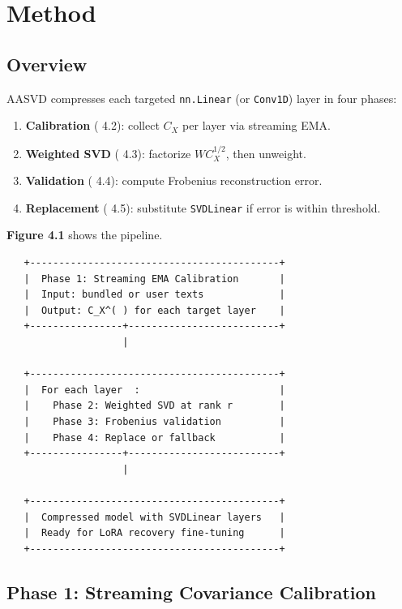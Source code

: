 
\section{Method}

\subsection{Overview}

AASVD compresses each targeted \texttt{nn.Linear} (or \texttt{Conv1D}) layer in four phases:

\begin{enumerate}
\item \textbf{Calibration} ( 4.2): collect $C_X$ per layer via streaming EMA.
\item \textbf{Weighted SVD} ( 4.3): factorize $W C_X^{1/2}$, then unweight.
\item \textbf{Validation} ( 4.4): compute Frobenius reconstruction error.
\item \textbf{Replacement} ( 4.5): substitute \texttt{SVDLinear} if error is within threshold.

\end{enumerate}
\textbf{Figure 4.1} shows the pipeline.

\begin{lstlisting}
   +-------------------------------------------+
   |  Phase 1: Streaming EMA Calibration       |
   |  Input: bundled or user texts             |
   |  Output: C_X^( ) for each target layer    |
   +----------------+--------------------------+
                    |
                     
   +-------------------------------------------+
   |  For each layer  :                        |
   |    Phase 2: Weighted SVD at rank r        |
   |    Phase 3: Frobenius validation          |
   |    Phase 4: Replace or fallback           |
   +----------------+--------------------------+
                    |
                     
   +-------------------------------------------+
   |  Compressed model with SVDLinear layers   |
   |  Ready for LoRA recovery fine-tuning      |
   +-------------------------------------------+
\end{lstlisting}

\subsection{Phase 1: Streaming Covariance Calibration}

